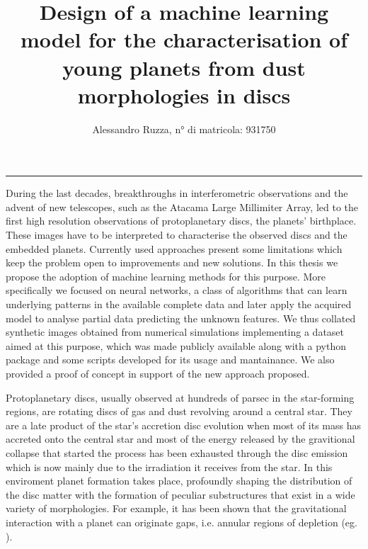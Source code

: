 \documentclass[a4paper,10pt, margin=1cm]{article}
\title{\fontsize{17}{17}\textbf{Design of a machine learning model for the characterisation of young planets from dust morphologies in discs}}
\author{Alessandro Ruzza, n° di matricola: 931750\vspace{-5em}}
\date{}
\begin{document}
\maketitle
\noindent\rule[0.5ex]{10cm}{1pt}

\vspace{2em}
During the last decades, breakthroughs in interferometric observations 
and the advent of new telescopes, such as the Atacama Large Millimiter Array,  
led to the first high resolution observations of protoplanetary discs,
the planets' birthplace. These images have to be interpreted to characterise the observed discs and the
embedded planets.
Currently used approaches present some limitations which keep the problem open to improvements and new solutions.
In this thesis we propose the adoption of machine learning methods 
for this purpose.
More specifically we focused on neural networks, a class of algorithms that can learn underlying patterns in the available complete data
and later apply the acquired model to analyse partial data predicting the unknown features.
We thus collated synthetic images obtained from numerical simulations implementing a dataset aimed at this purpose, which
was made publicly available along with a python package and some scripts developed for its usage and mantainance.
We also provided a proof of concept in support of the new approach proposed.

Protoplanetary discs, usually observed at hundreds of parsec in the star-forming regions, 
are rotating discs of gas and dust revolving around a central star.
They are a late product of the star's accretion disc evolution when most of its mass has accreted onto
the central star and most of the energy released by the gravitional collapse that started the process has been exhausted through 
the disc emission which is now mainly due to the irradiation it receives from the star.
In this enviroment planet formation takes place, profoundly shaping the distribution of the disc matter with the formation
of peculiar substructures that exist in a wide variety of morphologies.
For example, it has been shown that the gravitational interaction with a planet can originate gaps, i.e.
annular regions of depletion (eg. \citealt{gap_opening2,gap_opening3}).

\begin{comment}
To observe these discs three categories of emitted radiation are usually probed: the light scattered by micron-sized dust grains,
the molecular emission of CO or HD in the gas component and the dust thermal continuum emission in the millimetric 
which is the tracer probed in the simulations used in this thesis. 
Among the various tracers probed to obtain images 
\end{comment}
\end{document}
